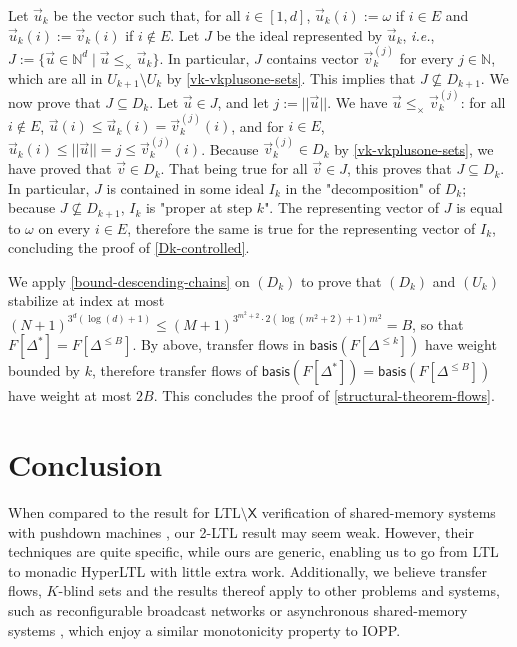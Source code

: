 \documentclass[10pt,a4paper]{article}
\let\mathbb\mathds
\renewcommand{\leq}{\leqslant}
\newcommand{\nats}{\mathbb{N}}
\newcommand{\set}[1]{\{#1\}}
\newcommand{\nset}[2]{[#1,#2]}
\newcommand{\deff}{:=}
\newcommand{\norm}[1]{||#1||}
\newcommand{\transitions}{\Delta}
\newcommand*{\minwqo}[1]{\mathsf{basis}(#1)}
\newcommand*{\transfersof}[1]{F[#1]}
\newcommand{\Tleq}[1]{\transfersof{\transitions^{\leq #1}}}
\newcommand*{\leprod}{\leq_{\times}}
\newcommand{\ltlnext}{\mathsf{X}}
\begin{document}
\begin{appendixproof}
	Let \(\vec{u}_k\) be the vector such that, for all \(i \in \nset{1}{d}\), \(\vec{u}_k(i) \deff \omega\) if \(i \in E\) and \(\vec{u}_k(i) \deff \vec{v}_k(i)\) if \(i \notin E\).
	Let \(J\) be the ideal represented by \(\vec{u}_k\), \emph{i.e.}, \(J := \set{\vec{u} \in \nats^d \mid \vec{u} \leprod \vec{u}_k}\).
	In particular, \(J\) contains vector \(\vec{v}_k^{(j)}\) for every \(j \in \nats\), which are all in \(U_{k+1} \setminus U_k\) by \cref{vk-vkplusone-sets}.
	This implies that \(J \nsubseteq D_{k+1}\).
	We now prove that \(J \subseteq D_k\).
	Let \(\vec{u} \in J\), and let \(j \deff \norm{\vec{u}}\).
	We have \(\vec{u} \leprod \vec{v}_k^{(j)}\): for all \(i \notin E\), \(\vec{u}(i) \leq \vec{u}_k(i) = \vec{v}_k^{(j)}(i)\), and for \(i \in E\), \(\vec{u}_k(i) \leq \norm{\vec{u}} = j \leq \vec{v}_k^{(j)}(i)\).
	Because \(\vec{v}_k^{(j)} \in D_k\) by \cref{vk-vkplusone-sets}, we have proved that \(\vec{v} \in D_k\).
	That being true for all \(\vec{v} \in J\), this proves that \(J \subseteq D_k\).
	In particular, \(J\) is contained in some ideal \(I_k\) in the "decomposition" of \(D_k\); because \(J \nsubseteq D_{k+1}\), \(I_k\) is "proper at step \(k\)".
	The representing vector of \(J\) is equal to \(\omega\) on every \(i \in E\), therefore the same is true for the representing vector of \(I_k\), concluding the proof of \cref{Dk-controlled}.
\end{appendixproof}

We apply \cref{bound-descending-chains} on \((D_k)\) to prove that \((D_k)\) and \((U_k)\) stabilize at index at most \((N+1)^{3^{d} (\log(d)+1)} \leq (M+1)^{3^{m^2+2} \cdot 2(\log(m^2+2) +1) m^2} = B\), so that \(\transfersof{\transitions^*} = \transfersof{\transitions^{\leq B}}\).
By above, transfer flows in \(\minwqo{\Tleq{k}}\) have weight bounded by \(k\), therefore transfer flows of \(\minwqo{\transfersof{\transitions^*}} = \minwqo{\Tleq{B}}\) have weight at most \(2B\).
This concludes the proof of \cref{structural-theorem-flows}.
%
%
\section{Conclusion}
%
When compared to the \NEXPTIME result for LTL\(\setminus \ltlnext\) verification of shared-memory systems with pushdown machines \cite{FortinMW17}, our 2-\EXPSPACE LTL result may seem weak.
However, their techniques are quite specific, while ours are generic, enabling us to go from LTL to monadic HyperLTL with little extra work.
Additionally, we believe transfer flows, \(K\)-blind sets and the results thereof apply to other problems and systems, such as reconfigurable broadcast networks \cite{DSTZ12} or asynchronous shared-memory systems \cite{EGM13}, which enjoy a similar monotonicity property to IOPP.
%
\end{document}
